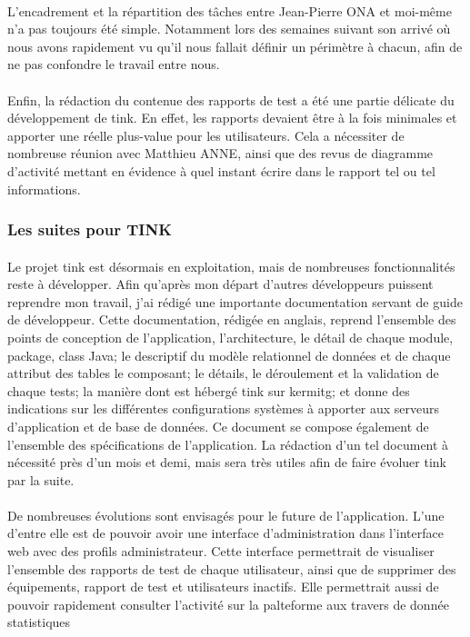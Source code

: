\documentclass[12pt,a4paper]{report}
\begin{document}
\paragraph*{}L'encadrement et la répartition des tâches entre Jean-Pierre ONA et moi-même n'a pas toujours été simple. Notamment lors des semaines suivant son arrivé où nous avons rapidement vu qu'il nous fallait définir un périmètre à chacun, afin de ne pas confondre le travail entre nous.
\paragraph*{}Enfin, la rédaction du contenue des rapports de test a été une partie délicate du développement de \gls{tink}. En effet, les rapports devaient être à la fois minimales et apporter une réelle plus-value pour les utilisateurs. Cela a nécessiter de nombreuse réunion avec Matthieu ANNE, ainsi que des revus de diagramme d'activité mettant en évidence à quel instant écrire dans le rapport tel ou tel informations. \\

\subsubsection{Les suites pour TINK}
\paragraph*{}Le projet \gls{tink} est désormais en exploitation, mais de nombreuses fonctionnalités reste à développer. Afin qu'après mon départ d'autres développeurs puissent reprendre mon travail, j'ai rédigé une importante documentation servant de guide de développeur. Cette documentation, rédigée en anglais, reprend l'ensemble des points de conception de l'application, l'architecture, le détail de chaque module, package, class Java; le descriptif du modèle relationnel de données et de chaque attribut des tables le composant; le détails, le déroulement et la validation de chaque tests; la manière dont est hébergé \gls{tink} sur \gls{kermitg}; et donne des indications sur les différentes configurations systèmes à apporter aux serveurs d'application et de base de données. Ce document se compose également de l'ensemble des spécifications de l'application. La rédaction d'un tel document à nécessité près d'un mois et demi, mais sera très utiles afin de faire évoluer \gls{tink} par la suite.
\paragraph*{}De nombreuses évolutions sont envisagés pour le future de l'application. L'une d'entre elle est de pouvoir avoir une interface d'administration dans l'interface web avec des profils administrateur. Cette interface permettrait de visualiser l'ensemble des rapports de test de chaque utilisateur, ainsi que de supprimer des équipements, rapport de test et utilisateurs inactifs. Elle permettrait aussi de pouvoir rapidement consulter l'activité sur la palteforme aux travers de donnée statistiques
\end{document}
